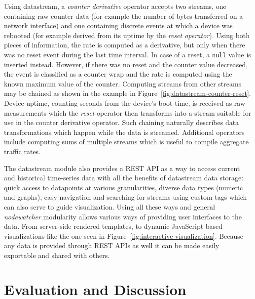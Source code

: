 \documentclass[5p,sort&compress]{elsarticle}
\newcommand{\nodewatcher}{\textit{nodewatcher}}
\begin{document}
Using datastream, a \textit{counter derivative} operator accepts two streams, one containing raw counter data (for example the number of bytes transferred on a network interface) and one containing discrete events at which a device was rebooted (for example derived from its uptime by the \textit{reset operator}).
Using both pieces of information, the rate is computed as a derivative, but only when there was no reset event during the last time interval.
In case of a reset, a \texttt{null} value is inserted instead.
However, if there was no reset and the counter value decreased, the event is classified as a counter wrap and the rate is computed using the known maximum value of the counter.
Computing streams from other streams may be chained as shown in the example in Figure~\ref{fig:datastream-counter-reset}.
Device uptime, counting seconds from the device's boot time, is received as raw measurements which the \textit{reset} operator then transforms into a stream suitable for use in the counter derivative operator.
Such chaining naturally describes data transformations which happen while the data is streamed.
Additional operators include computing sums of multiple streams which is useful to compile aggregate traffic rates.

The datastream module also provides a REST API as a way to access current and historical time-series data with all the benefits of datastream data storage: quick access to datapoints at various granularities, diverse data types (numeric and graphs), easy navigation and searching for streams using custom tags which can also serve to guide visualization.
Using all these ways and general \nodewatcher{} modularity allows various ways of providing user interfaces to the data.
From server-side rendered templates, to dynamic JavaScript based visualizations like the one seen in Figure~\ref{fig:interactive-visualization}.
Because any data is provided through REST APIs as well it can be made easily exportable and shared with others.

\section{Evaluation and Discussion}
\label{sec:evaluation}
\end{document}
